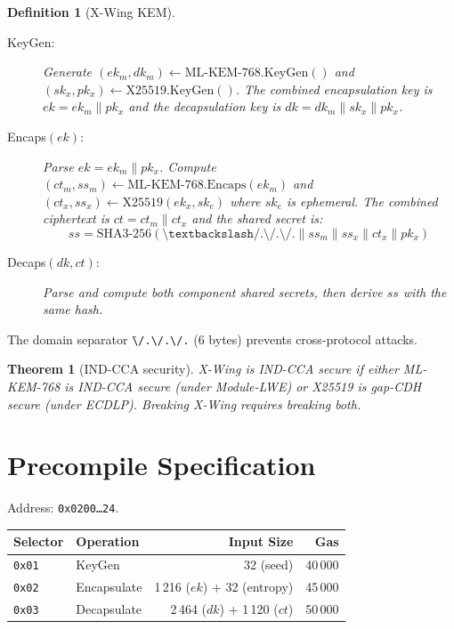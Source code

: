 \documentclass[11pt,a4paper]{article}
\newtheorem{theorem}{Theorem}
\newtheorem{definition}{Definition}
\begin{document}
\begin{definition}[X-Wing KEM]
\leavevmode
\begin{description}
  \item[KeyGen:] Generate $(ek_m, dk_m) \gets \text{ML-KEM-768.KeyGen}()$ and
    $(sk_x, pk_x) \gets \text{X25519.KeyGen}()$. The combined encapsulation key
    is $ek = ek_m \| pk_x$ and the decapsulation key is $dk = dk_m \| sk_x \| pk_x$.
  \item[Encaps$(ek)$:] Parse $ek = ek_m \| pk_x$. Compute
    $(ct_m, ss_m) \gets \text{ML-KEM-768.Encaps}(ek_m)$ and
    $(ct_x, ss_x) \gets \text{X25519}(ek_x, sk_e)$ where $sk_e$ is ephemeral.
    The combined ciphertext is $ct = ct_m \| ct_x$ and the shared secret is:
    \[
      ss = \text{SHA3-256}(\texttt{\.{}\textbackslash/.\textbackslash/.\textbackslash/.} \| ss_m \| ss_x \| ct_x \| pk_x)
    \]
  \item[Decaps$(dk, ct)$:] Parse and compute both component shared secrets,
    then derive $ss$ with the same hash.
\end{description}
\end{definition}

The domain separator \texttt{\.{}\textbackslash/.\textbackslash/.\textbackslash/.} (6 bytes) prevents
cross-protocol attacks.

\begin{theorem}[IND-CCA security]
X-Wing is IND-CCA secure if either ML-KEM-768 is IND-CCA secure (under Module-LWE)
or X25519 is gap-CDH secure (under ECDLP). Breaking X-Wing requires breaking both.
\end{theorem}

\section{Precompile Specification}

Address: \texttt{0x0200\ldots24}.

\begin{table}[H]
\centering
\begin{tabular}{llrr}
\toprule
\textbf{Selector} & \textbf{Operation} & \textbf{Input Size} & \textbf{Gas} \\
\midrule
\texttt{0x01} & KeyGen & 32 (seed) & 40\,000 \\
\texttt{0x02} & Encapsulate & 1\,216 ($ek$) + 32 (entropy) & 45\,000 \\
\texttt{0x03} & Decapsulate & 2\,464 ($dk$) + 1\,120 ($ct$) & 50\,000 \\
\bottomrule
\end{tabular}
\end{table}
\end{document}
